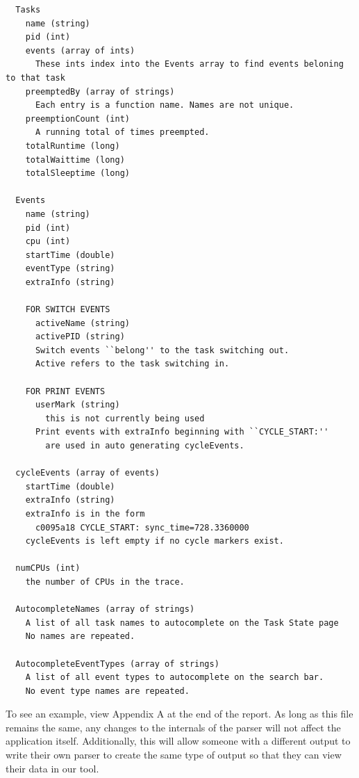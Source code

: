 \documentclass{hmcclinic}
\begin{document}
  \begin{verbatim}
  Tasks
    name (string)
    pid (int)
    events (array of ints)
      These ints index into the Events array to find events beloning to that task
    preemptedBy (array of strings)
      Each entry is a function name. Names are not unique.
    preemptionCount (int)
      A running total of times preempted.
    totalRuntime (long)
    totalWaittime (long)
    totalSleeptime (long)

  Events
    name (string)
    pid (int)
    cpu (int)
    startTime (double)
    eventType (string)
    extraInfo (string)

    FOR SWITCH EVENTS
      activeName (string)
      activePID (string)
      Switch events ``belong'' to the task switching out.
      Active refers to the task switching in.

    FOR PRINT EVENTS
      userMark (string)
        this is not currently being used
      Print events with extraInfo beginning with ``CYCLE_START:''
        are used in auto generating cycleEvents.

  cycleEvents (array of events)
    startTime (double)
    extraInfo (string)
    extraInfo is in the form
      c0095a18 CYCLE_START: sync_time=728.3360000
    cycleEvents is left empty if no cycle markers exist.

  numCPUs (int)
    the number of CPUs in the trace.

  AutocompleteNames (array of strings)
    A list of all task names to autocomplete on the Task State page
    No names are repeated.

  AutocompleteEventTypes (array of strings)
    A list of all event types to autocomplete on the search bar.
    No event type names are repeated.

  \end{verbatim}

  To see an example, view Appendix A at the end of the report.
  \newline
  \newline
  As long as this file remains the same, any changes to the internals of the
  parser will not affect the application itself. Additionally, this will allow
  someone with a different output to write their own parser to create the same
  type of output so that they can view their data in our tool.
\end{document}
